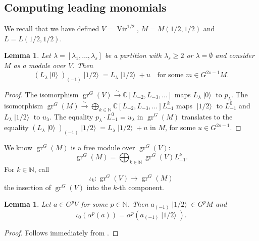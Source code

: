 \documentclass[a4paper, 12pt, reqno]{amsart}
\newtheorem{lemma}[theorem]{Lemma}
\theoremstyle{remark}
\numberwithin{equation}{subsection}
\DeclareMathOperator{\Vir}{Vir}
\DeclareMathOperator{\gr}{gr}
\DeclareMathOperator{\vac}{|0\rangle}
\DeclareMathOperator{\vachalf}{|1/2\rangle}
\begin{document}
\subsection{Computing leading monomials}
\label{sec:comp-lead-monom}

We recall that we have defined $V = \Vir^{1/2}$, $M = M(1/2, 1/2)$ and $L = L(1/2, 1/2)$.

\begin{lemma}
  \label{lmm:27}
  Let $\lambda = [\lambda_1, \dots, \lambda_s]$ be a partition with $\lambda_s \ge 2$ or $\lambda = \emptyset$ and consider $M$ as a module over $V$.
  Then
  \begin{equation*}
    (L_\lambda\vac)_{(-1)}\vachalf = L_\lambda\vachalf + u \quad \text{for some }m \in G^{2s - 1}M.
  \end{equation*}
\end{lemma}

\begin{proof}
  The isomorphism $\gr^G(V) \xrightarrow{\sim} \mathbb{C}[L_{-2}, L_{-3}, \dots]$ maps $L_\lambda\vac$ to $p_\lambda$.
  The isomorphism $\gr^G(M) \xrightarrow{\sim} \bigoplus_{k \in \mathbb{N}}\mathbb{C}[L_{-2}, L_{-3}, \dots]L_{-1}^k$ maps $\vachalf$ to $L_{-1}^0$ and $L_\lambda\vachalf$ to $u_\lambda$.
  The equality $p_\lambda\cdot L_{-1}^0 = u_\lambda$ in $\gr^G(M)$ translates to the equality $(L_\lambda\vac)_{(-1)}\vachalf = L_\lambda\vachalf + u$ in $M$, for some $u \in G^{2s - 1}$.
\end{proof}

We know $\gr^G(M)$ is a free module over $\gr^G(V)$:
\begin{equation*}
  \gr^G(M) = \bigoplus_{k \in \mathbb{N}}\gr^G(V)L_{-1}^k.
\end{equation*}
For $k \in \mathbb{N}$, call
\begin{equation*}
  \iota_k: \gr^G(V) \to \gr^G(M)
\end{equation*}
the insertion of $\gr^G(V)$ into the $k$-th component.

\begin{lemma}
  \label{lmm:28}
  Let $a \in G^pV$ for some $p \in \mathbb{N}$.
  Then $a_{(-1)}\vachalf \in G^pM$ and
  \begin{equation*}
    \iota_0(\alpha^p(a)) = \alpha^p(a_{(-1)}\vachalf).
  \end{equation*}
\end{lemma}

\begin{proof}
  Follows immediately from .
\end{proof}
\end{document}
